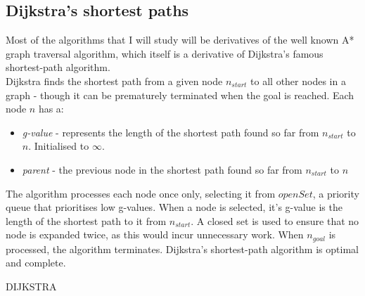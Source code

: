 \documentclass[12pt,notitlepage]{report}
\begin{document}
\subsection {Dijkstra's shortest paths}

Most of the algorithms that I will study will be derivatives of the well known A* graph traversal algorithm, which itself is a derivative of Dijkstra's famous shortest-path algorithm.\\

\noindent
Dijkstra finds the shortest path from a given node {$n_{start}$} to all other nodes in a graph - though it can be prematurely terminated when the goal is reached. Each node {$n$} has a:
\begin{itemize}
\item {\em g-value} - represents the length of the shortest path found so far from {$n_{start}$} to {$n$}. Initialised to $\infty$.
\item {\em parent} - the previous node in the shortest path found so far from {$n_{start}$} to {$n$}
\end{itemize}
The algorithm processes each node once only, selecting it from $openSet$, a priority queue that prioritises low g-values. When a node is selected, it's g-value is the length of the shortest path to it from {$n_{start}$}. A closed set is used to ensure that no node is expanded twice, as this would incur unnecessary work. When {$n_{goal}$} is processed, the algorithm terminates. Dijkstra's shortest-path algorithm is optimal and complete.\\

\begin{algorithm}[htp]
  \SetAlgoLined\DontPrintSemicolon
  \setcounter{AlgoLine}{0}
  \caption{{\sc DIJKSTRA}}
\end{algorithm} 
\end{document}
